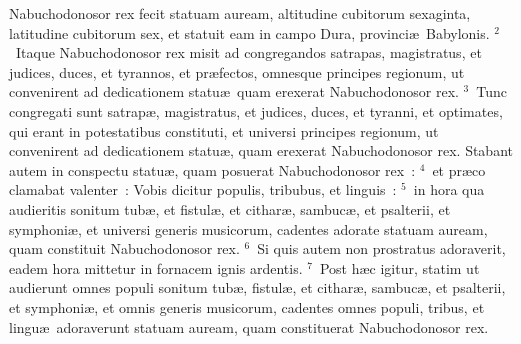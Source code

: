 \lettrine[lines=10,image=true,loversize=0.05,lraise=-0.03]{N}{}abuchodonosor rex fecit statuam auream, altitudine cubitorum sexaginta, latitudine cubitorum sex, et statuit eam in campo Dura, provinci\ae\ Babylonis.
${}^{2}$~Itaque Nabuchodonosor rex misit ad congregandos satrapas, magistratus, et judices, duces, et tyrannos, et pr\ae fectos, omnesque principes regionum, ut convenirent ad dedicationem statu\ae\ quam erexerat Nabuchodonosor rex.
${}^{3}$~Tunc congregati sunt satrap\ae , magistratus, et judices, duces, et tyranni, et optimates, qui erant in potestatibus constituti, et universi principes regionum, ut convenirent ad dedicationem statu\ae , quam erexerat Nabuchodonosor rex. Stabant autem in conspectu statu\ae , quam posuerat Nabuchodonosor rex~:
${}^{4}$~et pr\ae co clamabat valenter~: Vobis dicitur populis, tribubus, et linguis~:
${}^{5}$~in hora qua audieritis sonitum tub\ae , et fistul\ae , et cithar\ae , sambuc\ae , et psalterii, et symphoni\ae , et universi generis musicorum, cadentes adorate statuam auream, quam constituit Nabuchodonosor rex.
${}^{6}$~Si quis autem non prostratus adoraverit, eadem hora mittetur in fornacem ignis ardentis.
${}^{7}$~Post h\ae c igitur, statim ut audierunt omnes populi sonitum tub\ae , fistul\ae , et cithar\ae , sambuc\ae , et psalterii, et symphoni\ae , et omnis generis musicorum, cadentes omnes populi, tribus, et lingu\ae\ adoraverunt statuam auream, quam constituerat Nabuchodonosor rex.


